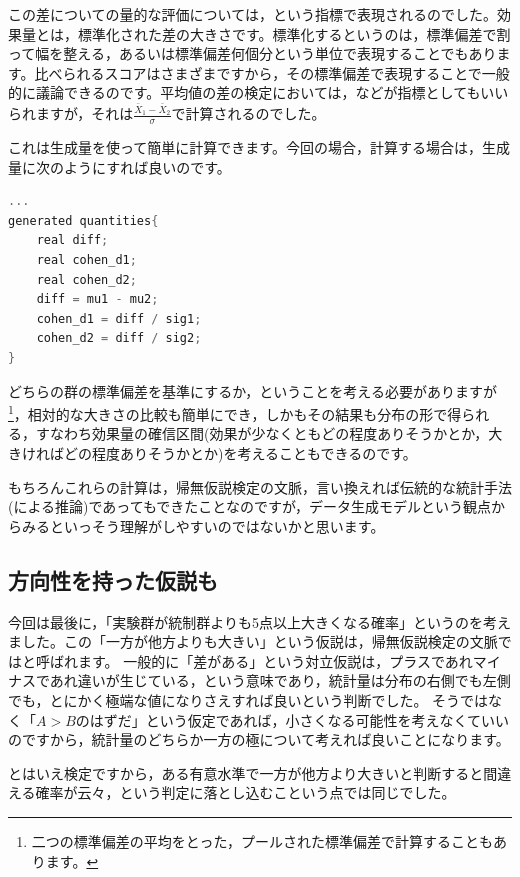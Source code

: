 \documentclass{ltjsbook}
\begin{document}
この差についての量的な評価については，という指標で表現されるのでした。効果量とは，標準化された差の大きさです。標準化するというのは，標準偏差で割って幅を整える，あるいは標準偏差何個分という単位で表現することでもあります。比べられるスコアはさまざまですから，その標準偏差で表現することで一般的に議論できるのです。平均値の差の検定においては，などが指標としてもいいられますが，それは$\frac{\bar{X}_1-\bar{X}_2}{\sigma}$で計算されるのでした。

これは生成量を使って簡単に計算できます。今回の場合，計算する場合は，生成量に次のようにすれば良いのです。
\begin{lstlisting}[language=C++,label={code:19_06},caption={生成量ブロックで効果量の算出}]
    ...
generated quantities{
    real diff;
    real cohen_d1;
    real cohen_d2;
    diff = mu1 - mu2;
    cohen_d1 = diff / sig1;
    cohen_d2 = diff / sig2;
}

\end{lstlisting}

どちらの群の標準偏差を基準にするか，ということを考える必要がありますが\footnote{二つの標準偏差の平均をとった，プールされた標準偏差で計算することもあります。}，相対的な大きさの比較も簡単にでき，しかもその結果も分布の形で得られる，すなわち効果量の確信区間(効果が少なくともどの程度ありそうかとか，大きければどの程度ありそうかとか)を考えることもできるのです。

もちろんこれらの計算は，帰無仮説検定の文脈，言い換えれば伝統的な統計手法(による推論)であってもできたことなのですが，データ生成モデルという観点からみるといっそう理解がしやすいのではないかと思います。
\subsection{方向性を持った仮説も}
今回は最後に，「実験群が統制群よりも5点以上大きくなる確率」というのを考えました。この「一方が他方よりも大きい」という仮説は，帰無仮説検定の文脈ではと呼ばれます。
一般的に「差がある」という対立仮説は，プラスであれマイナスであれ違いが生じている，という意味であり，統計量は分布の右側でも左側でも，とにかく極端な値になりさえすれば良いという判断でした。
そうではなく「$A>B$のはずだ」という仮定であれば，小さくなる可能性を考えなくていいのですから，統計量のどちらか一方の極について考えれば良いことになります。

とはいえ検定ですから，ある有意水準で一方が他方より大きいと判断すると間違える確率が云々，という判定に落とし込むこという点では同じでした。
\end{document}
